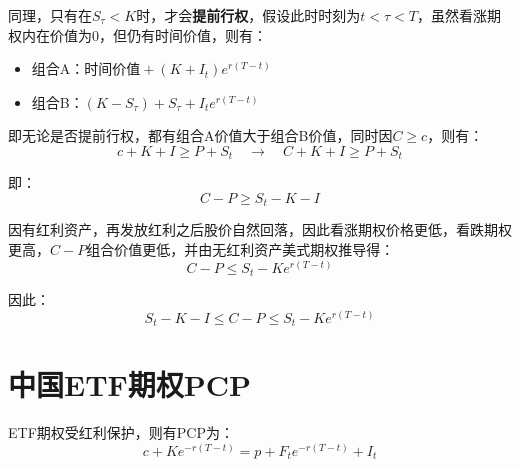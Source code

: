 \documentclass[11pt]{article}
\begin{document}
同理，只有在$S_\tau<K$时，才会\textbf{提前行权}，假设此时时刻为$t<\tau<T$，虽然看涨期权内在价值为0，但仍有时间价值，则有：
\begin{itemize}
\setlength{\itemindent}{2em}
    \item 组合A：$ 时间价值 + (K+I_t)e^{r(T-t)}$
    \item 组合B：$(K-S_\tau) + S_\tau + I_t e^{r(T-t)}$
\end{itemize}

即无论是否提前行权，都有组合A价值大于组合B价值，同时因$C \geq c$，则有：
\begin{equation*}
    c + K + I \geq P + S_t \quad \rightarrow \quad C + K +I \geq P + S_t
\end{equation*}

即：
\begin{equation*}
    C-P \geq S_t - K - I
\end{equation*}

因有红利资产，再发放红利之后股价自然回落，因此看涨期权价格更低，看跌期权更高，$C-P$组合价值更低，并由无红利资产美式期权推导得：
\begin{equation*}
    C-P \leq S_t - Ke^{r(T-t)}
\end{equation*}

因此：
\begin{equation*}
   S_t - K - I \leq C-P \leq S_t - Ke^{r(T-t)}
\end{equation*}


\section{中国ETF期权PCP}
ETF期权受红利保护，则有PCP为：
\begin{equation*}
    c + Ke^{-r(T-t)} = p + F_t e^{-r(T-t)} + I_t 
\end{equation*}
\end{document}
